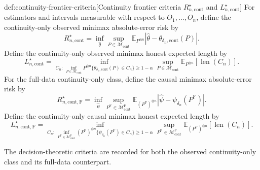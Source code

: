 \begin{definitionv}{def:continuity-frontier-criteria}[Continuity frontier criteria \(R_{n,\mathrm{cont}}^\star\) and \(L_{n,\mathrm{cont}}^\star\)]
For estimators and intervals measurable with respect to \(O_1,\ldots,O_n\), define the continuity-only observed minimax absolute-error risk by
\[
R_{n,\mathrm{cont}}^\star
=
\inf_{\widehat\theta}\sup_{P\in\mathcal M_{\mathrm{cont}}}
\mathbb E_{P^{\otimes n}}
\left|\widehat\theta-\theta_{\delta_n,\mathrm{cont}}(P)\right|.
\]
Define the continuity-only observed minimax honest expected length by
\[
L_{n,\mathrm{cont}}^\star
=
\inf_{C_n:\,\inf_{P\in\mathcal M_{\mathrm{cont}}}P^{\otimes n}
\{\theta_{\delta_n,\mathrm{cont}}(P)\in C_n\}\geq1-\alpha}
\sup_{P\in\mathcal M_{\mathrm{cont}}}
\mathbb E_{P^{\otimes n}}\!\left[\operatorname{len}(C_n)\right].
\]
For the full-data continuity-only class, define the causal minimax absolute-error risk by
\[
R_{n,\mathrm{cont},\mathrm F}^\star
=
\inf_{\widehat\psi}\sup_{P^{\mathrm F}\in\mathcal M_{\mathrm{cont}}^{\mathrm F}}
\mathbb E_{(P^{\mathrm F})^{\otimes n}}
\left|\widehat\psi-\psi_{\delta_n}(P^{\mathrm F})\right|.
\]
Define the continuity-only causal minimax honest expected length by
\[
L_{n,\mathrm{cont},\mathrm F}^\star
=
\inf_{C_n:\,\inf_{P^{\mathrm F}\in\mathcal M_{\mathrm{cont}}^{\mathrm F}}
(P^{\mathrm F})^{\otimes n}\{\psi_{\delta_n}(P^{\mathrm F})\in C_n\}\geq1-\alpha}
\sup_{P^{\mathrm F}\in\mathcal M_{\mathrm{cont}}^{\mathrm F}}
\mathbb E_{(P^{\mathrm F})^{\otimes n}}\!\left[\operatorname{len}(C_n)\right].
\]
\end{definitionv}

The decision-theoretic criteria are recorded for both the observed continuity-only class and its full-data counterpart.

